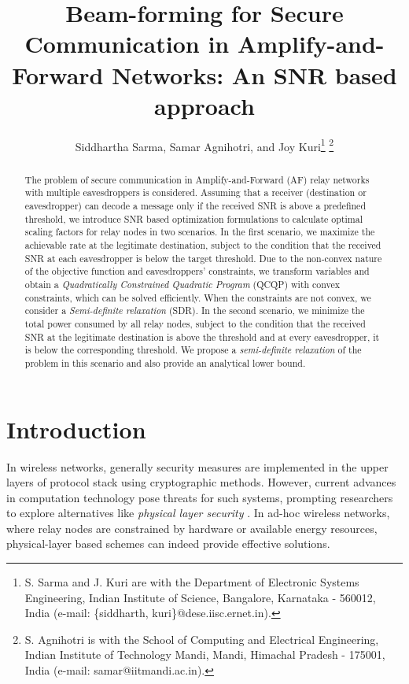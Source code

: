\documentclass[journal,,draftclsnofoot letterpaper, onecolumn]{IEEEtran}
\begin{document}
\title{Beam-forming for Secure Communication in Amplify-and-Forward Networks: An SNR based approach}\author{Siddhartha Sarma, Samar Agnihotri, and Joy Kuri\thanks{S. Sarma and J. Kuri are with the Department of Electronic Systems Engineering, Indian Institute of Science, Bangalore, Karnataka - 560012, India (e-mail: \{siddharth, kuri\}@dese.iisc.ernet.in).}
\thanks{S. Agnihotri is with the School of Computing and Electrical Engineering, Indian Institute of Technology Mandi, Mandi, Himachal Pradesh - 175001, India (e-mail: samar@iitmandi.ac.in).}
}

\maketitle

\begin{abstract}
The problem of secure communication in Amplify-and-Forward (AF) relay networks with multiple eavesdroppers is considered. Assuming that a receiver (destination or eavesdropper) can decode a message only if the received SNR is above a predefined threshold, we introduce SNR based optimization formulations to calculate optimal scaling factors for relay nodes in two scenarios. In the first scenario, we maximize the achievable rate at the legitimate destination, subject to the condition that the received SNR at each eavesdropper is below the target threshold. Due to the non-convex nature of the objective function and eavesdroppers' constraints, we transform variables and obtain a \textit{Quadratically Constrained Quadratic Program} (QCQP) with convex constraints, which can be solved efficiently. When the constraints are not convex, we consider a \textit{Semi-definite relaxation} (SDR). In the second scenario, we minimize the total power consumed by all relay nodes, subject to the condition that the received SNR at the legitimate destination is above the threshold and at every eavesdropper, it is below the corresponding threshold. We propose a \textit{semi-definite relaxation} of the problem in this scenario and also provide an analytical lower bound. 
\end{abstract}

\section{Introduction}
In wireless networks, generally security measures are implemented in the upper layers of protocol stack using cryptographic methods. However, current advances in computation technology pose threats for such systems, prompting researchers to explore alternatives like \textit{physical layer security} \cite{bloch2011physical}. In ad-hoc wireless networks, where relay nodes are constrained by hardware or available energy resources, physical-layer based schemes can indeed provide effective solutions. 
\end{document}
